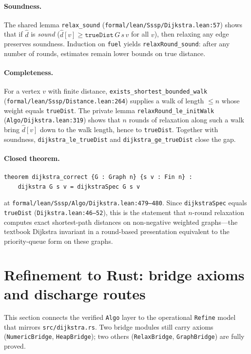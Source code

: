 \documentclass[11pt,a4paper]{article}
\newcommand{\Dijkstra}{Dijkstra\xspace}
\newcommand{\dhat}{\hat{d}}
\newcommand{\code}[1]{\texttt{#1}}
\theoremstyle{plain}
\theoremstyle{definition}
\begin{document}
\paragraph*{Soundness.}
The shared lemma \code{relax\_sound}
(\code{formal/lean/Sssp/Dijkstra.lean:57}) shows that if $\dhat$ is
\emph{sound} ($\dhat[v] \geq \code{trueDist}\,G\,s\,v$ for all $v$), then
relaxing any edge preserves soundness. Induction on \code{fuel} yields
\code{relaxRound\_sound}: after any number of rounds, estimates remain
lower bounds on true distance.

\paragraph*{Completeness.}
For a vertex $v$ with finite distance, \code{exists\_shortest\_bounded\_walk}
(\code{formal/lean/Sssp/Distance.lean:264}) supplies a walk of length
$\leq n$ whose weight equals \code{trueDist}. The private lemma
\code{relaxRound\_le\_initWalk} (\code{Algo/Dijkstra.lean:319}) shows that
$n$ rounds of relaxation along such a walk bring $\dhat[v]$ down to the walk
length, hence to \code{trueDist}. Together with soundness,
\code{dijkstra\_le\_trueDist} and \code{dijkstra\_ge\_trueDist} close the gap.

\paragraph*{Closed theorem.}
\begin{verbatim}
theorem dijkstra_correct {G : Graph n} {s v : Fin n} :
    dijkstra G s v = dijkstraSpec G s v
\end{verbatim}
at \code{formal/lean/Sssp/Algo/Dijkstra.lean:479--480}.
Since \code{dijkstraSpec} equals \code{trueDist}
(\code{Dijkstra.lean:46--52}), this is
the statement that $n$-round relaxation computes exact shortest-path
distances on non-negative weighted graphs---the textbook \Dijkstra{}
invariant in a round-based presentation equivalent to the priority-queue
form on these graphs.

\section{Refinement to Rust: bridge axioms and discharge routes}\label{sec:refine}

This section connects the verified \code{Algo} layer to the operational
\code{Refine} model that mirrors \code{src/dijkstra.rs}. Two bridge modules
still carry axioms (\code{NumericBridge}, \code{HeapBridge}); two others
(\code{RelaxBridge}, \code{GraphBridge}) are fully proved.
\end{document}
